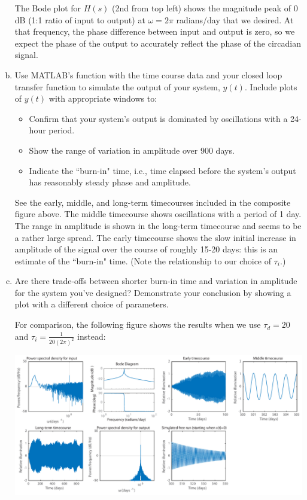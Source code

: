 \documentclass{article}
\begin{document}
\begin{enumerate}[a)]
{The Bode plot for $H(s)$ (2nd from top left) shows the magnitude peak of 0 dB (1:1 ratio of input to output) at $\omega = 2\pi$ radians/day that we desired. At that frequency, the phase difference between input and output is zero, so we expect the phase of the output to accurately reflect the phase of the circadian signal.
}

\item Use MATLAB's  function with the time course data and your closed loop transfer function to simulate the output of your system, $y(t)$. Include plots of $y(t)$ with appropriate windows to:
\begin{itemize}
\item Confirm that your system's output is dominated by oscillations with a 24-hour period.
\item Show the range of variation in amplitude over 900 days.
\item Indicate the ``burn-in" time, i.e., time elapsed before the system's output has reasonably steady phase and amplitude.
\end{itemize}

{\color{red}
See the early, middle, and long-term timecourses included in the composite figure above. The middle timecourse shows oscillations with a period of 1 day. The range in amplitude is shown in the long-term timecourse and seems to be a rather large spread. The early timecourse shows the slow initial increase in amplitude of the signal over the course of roughly 15-20 days: this is an estimate of the ``burn-in" time. (Note the relationship to our choice of $\tau_i$.)
}

\item Are there trade-offs between shorter burn-in time and variation in amplitude for the system you've designed? Demonstrate your conclusion by showing a plot with a different choice of parameters.\\

{\color{red}
For comparison, the following figure shows the results when we use $\tau_d=20$ and $\tau_i=\frac{1}{20(2\pi)^2}$ instead:

\begin{center}
\includegraphics[width=\textwidth]{problem1figs2.pdf}
\end{center}

}
\end{enumerate}
\end{document}

